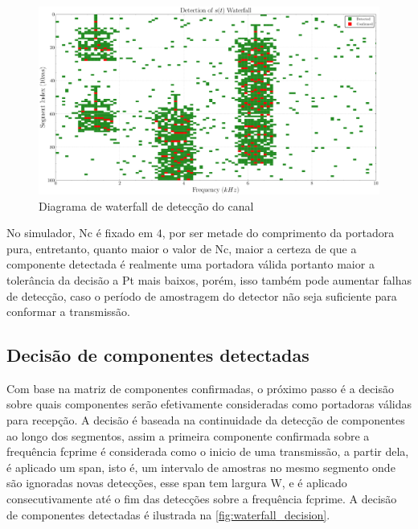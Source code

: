 \begin{figure}[H]
	\centering
	\caption{Diagrama de waterfall de detecção do canal}\label{fig:waterfall_detection}
	\includegraphics[width=\linewidth]{assets/cap3/example_detector_waterfall_detection.pdf}
\end{figure}

No simulador, \gls{Nc} é fixado em $4$, por ser metade do comprimento da portadora pura, entretanto, quanto maior o valor de \gls{Nc}, maior a certeza de que a componente detectada é realmente uma portadora válida portanto maior a tolerância da decisão a \gls{Pt} mais baixos, porém, isso também pode aumentar falhas de detecção, caso o período de amostragem do detector não seja suficiente para conformar a transmissão.

\subsection{Decisão de componentes detectadas}\label{sec:decisao}

Com base na matriz de componentes confirmadas, o próximo passo é a decisão sobre quais componentes serão efetivamente consideradas como portadoras válidas para recepção. A decisão é baseada na continuidade da detecção de componentes ao longo dos segmentos, assim a primeira componente confirmada sobre a frequência \gls{fcprime} é considerada como o inicio de uma transmissão, a partir dela, é aplicado um span, isto é, um intervalo de amostras no mesmo segmento onde são ignoradas novas detecções, esse span tem largura \gls{W}, e é aplicado consecutivamente até o fim das detecções sobre a frequência \gls{fcprime}. A decisão de componentes detectadas é ilustrada na \autoref{fig:waterfall_decision}.

